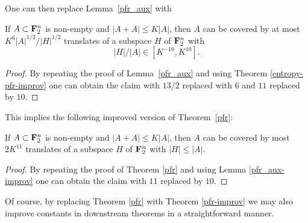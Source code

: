 One can then replace Lemma~\ref{pfr_aux} with
\begin{lemma}\label{pfr_aux-improv}
\leanok If $A \subset {\bf F}_2^n$ is non-empty and
$|A+A| \leq K|A|$, then $A$ can be covered by at most $K^6 |A|^{1/2}/|H|^{1/2}$ translates of a subspace $H$ of ${\bf F}_2^n$ with
\begin{equation}
  \label{ah}
  |H|/|A| \in [K^{-10}, K^{10}].
\end{equation}
\end{lemma}

\begin{proof}\leanok
By repeating the proof of Lemma~\ref{pfr_aux} and using Theorem \ref{entropy-pfr-improv} one can obtain the claim with $13/2$
replaced with $6$ and $11$ replaced by $10$.
\end{proof}

This implies the following improved version of Theorem~\ref{pfr}:

\begin{theorem}\label{pfr-improv}\leanok
  If $A \subset {\bf F}_2^n$ is non-empty and $|A+A| \leq K|A|$, then $A$ can be covered by most $2K^{11}$ translates of a subspace $H$ of ${\bf F}_2^n$ with $|H| \leq |A|$.
\end{theorem}

\begin{proof}\leanok
By repeating the proof of Theorem \ref{pfr} and using Lemma \ref{pfr_aux-improv} one can obtain the claim with $11$ replaced by $10$.
\end{proof}

Of course, by replacing Theorem \ref{pfr} with Theorem \ref{pfr-improv} we may also improve constants in downstream theorems in a straightforward manner.
